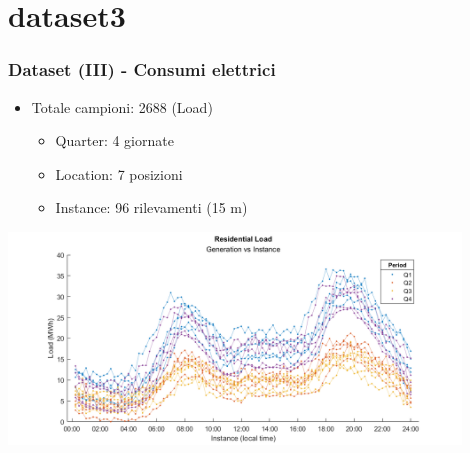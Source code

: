 \documentclass{beamer}
\begin{document}
\begin{frame}
        
\end{frame}

\section{dataset3}
\begin{frame}
    \frametitle{Dataset (III) - Consumi elettrici}
    \vfill
    
    \begin{itemize}
        \item Totale campioni: 2688 (Load) \begin{itemize}   
            \item Quarter: 4 giornate
            \item Location: 7 posizioni
            \item Instance: 96 rilevamenti (15 m)
        \end{itemize}
    \end{itemize}
    \vfill
    \centering
    \includegraphics[width=0.9\textwidth,keepaspectratio]{all_residenzial_load_period_lines.png}
        
\end{frame}
\end{document}
